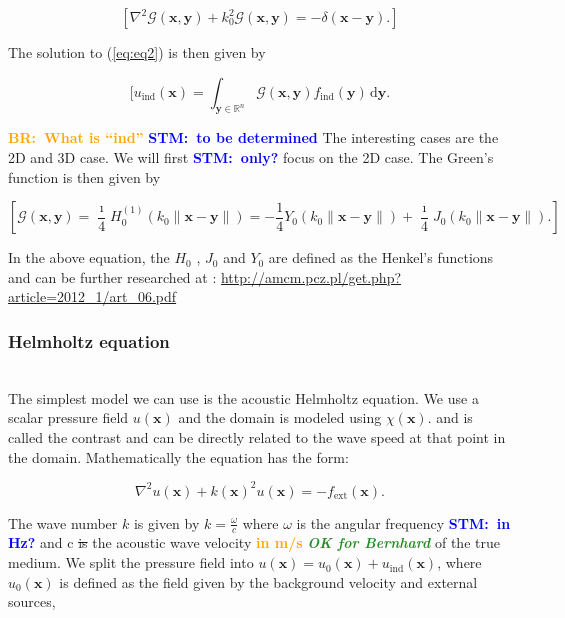 \documentclass[10pt,a4paper]{article}
\newcommand{\df}[1]{\, \ensuremath{\mbox{d}#1}}
\newcommand{\commentstm}[1]{\textcolor{blue}{\textbf{STM:\ #1}}}
\newcommand{\newstmtwo}[1]{\textcolor{orange}{\textbf{#1}}}
\newcommand{\oldstm}[1]{\sout{#1}}
\newcommand{\oldstmtwo}[1]{\xout{#1}}
\newcommand{\brok}{\textcolor{ForestGreen}{\textit{\textbf{OK for Bernhard}}}}
\newcommand{\commentbr}[1]{\textcolor{orange}{\textbf{BR:\ #1}}}
\begin{document}
\begin{equation} \label{eq:eq2}
[ \nabla^2 \mathcal{G}(\mathbf{x}, \mathbf{y}) + k_0^2
\mathcal{G}(\mathbf{x}, \mathbf{y}) = -\delta(\mathbf{x} -
\mathbf{y}). ]\end{equation}

The solution to (\ref{eq:eq2}) is then given by

\begin{equation} \label{eq:eq3}[ u_\text{ind}(\mathbf{x}) =
\int_{\mathbf{y} \in \mathbb{R}^n} \mathcal{G}(\mathbf{x}, \mathbf{y})
f_\text{ind}(\mathbf{y}) \df{\mathbf{y}}.\end{equation}

\commentbr{What is ``ind''}
\commentstm{to be determined}
The interesting cases are the 2D and 3D case. We will first
\commentstm{only?} focus on the 2D case. The Green's function is then
given by

\begin{equation} \label{eq:eq4}[ \mathcal{G}(\mathbf{x}, \mathbf{y}) =
\frac{\imath}{4} H_0^{(1)}(k_0 \|\mathbf{x} - \mathbf{y}\|) =
-\frac{1}{4} Y_0(k_0 \|\mathbf{x} - \mathbf{y}\|) + \frac{\imath}{4}
J_0(k_0 \|\mathbf{x} - \mathbf{y}\|).  ]\end{equation}

In the above equation, the $H_0$ , $J_0$ and $Y_0$ are defined as the
Henkel's functions and can be further researched at :
\url{http://amcm.pcz.pl/get.php?article=2012_1/art_06.pdf}

\subsubsection{Helmholtz equation}
\oldstmtwo{\textbf{2.2 Helmholtz equation}}\\
The simplest model we can use is the acoustic Helmholtz equation. We
use a scalar pressure field $u(\mathbf{x})$ and the domain is modeled
using $\chi(\mathbf{x})$. and is called the contrast and can be
directly related to the wave speed at that point in the domain.
Mathematically the equation has the form:

\begin{equation} \label{eq:eq5}
\nabla^2 u(\mathbf{x}) + k(\mathbf{x})^2 u(\mathbf{x}) =
-f_{\text{ext}}(\mathbf{x}).
\end{equation}

The wave number $k$ is given by $k = \frac{\omega}{c}$ where $\omega$
is the angular frequency \commentstm{in Hz?}  and c \oldstm{is} the
acoustic wave velocity \newstmtwo{in m/s} {\brok} of the true medium.
We split the pressure field into $u(\mathbf{x}) = u_0(\mathbf{x}) +
u_{\text{ind}}(\mathbf{x})$, where $u_0(\mathbf{x})$ is defined as the
field given by the background velocity and external sources,
\end{document}
